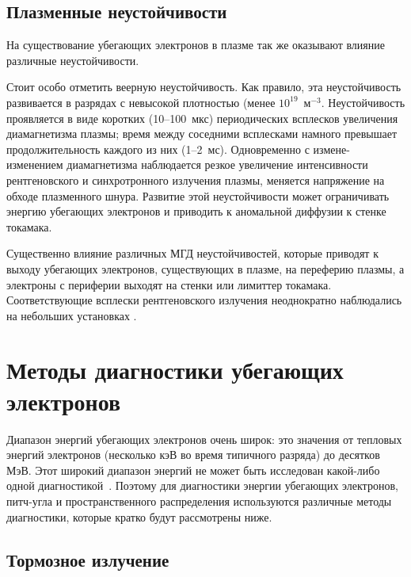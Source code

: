 
\subsection{Плазменные неустойчивости}

На существование убегающих электронов в плазме так же оказывают влияние различные неустойчивости. 

Стоит особо отметить веерную неустойчивость. Как правило, эта неустойчивость развивается в разрядах с невысокой плотностью (менее $10^{19}$~м${}^{-3}$. Неустойчивость проявляется в виде коротких (10--100~мкс) периодических всплесков увеличения диамагнетизма плазмы; время между соседними всплесками намного превышает продолжительность каждого из них (1--2~мс).  Одновременно с измене- изменением диамагнетизма наблюдается резкое увеличение интенсивности рентгеновского и синхротронного излучения плазмы, меняется напряжение на обходе плазменного шнура. Развитие этой неустойчивости может ограничивать энергию убегающих электронов и приводить к аномальной диффузии к стенке токамака. \cite{Parail1978,Leontovich1982}

Существенно влияние различных МГД неустойчивостей, которые приводят к выходу убегающих электронов, существующих в плазме, на переферию плазмы, а электроны с периферии выходят на стенки или лимиттер токамака. Соответствующие всплески рентгеновского излучения неоднократно наблюдались на небольших установках \cite{Shevelev2016,Shevelev2018}. 


\section{Методы диагностики убегающих электронов}

Диапазон энергий убегающих электронов очень широк: это значения от тепловых энергий электронов (несколько кэВ во время типичного разряда) до десятков МэВ. Этот широкий диапазон энергий не может быть исследован какой-либо одной диагностикой~\cite{Breizman2019}. Поэтому для диагностики энергии убегающих электронов, питч-угла и пространственного распределения используются различные методы диагностики, которые кратко будут рассмотрены ниже.


\subsection{Тормозное излучение}

